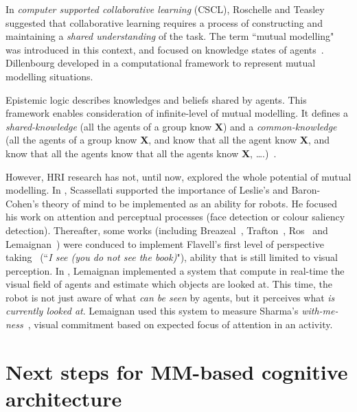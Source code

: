 \documentclass[conference]{IEEEtran}
\begin{document}
In \textit{computer supported collaborative learning} (CSCL), Roschelle and Teasley~\cite{roschelle1995construction} suggested that collaborative learning requires a process of constructing and maintaining a \textit{shared understanding} of the task. 
The term ``mutual modelling" was introduced in this context, and focused on knowledge states of agents~\cite{dillenbourg1999you}. Dillenbourg developed in \cite{sangin2007partner} a computational framework to represent mutual modelling situations.

Epistemic logic describes knowledges and beliefs shared by agents. This framework enables consideration of infinite-level of mutual modelling. It defines a \textit{shared-knowledge} (all the agents of a group know \textbf{X}) and a \textit{common-knowledge} (all the agents of a group know \textbf{X}, and know that all the agent know \textbf{X}, and know that all the agents know that all the agents know \textbf{X}, \dots.)~\cite{hendricks2008epistemic}. 

However, HRI research has not, until now, explored the whole potential of mutual modelling. In \cite{scassellati2002theory}, Scassellati supported the importance of Leslie's and Baron-Cohen's theory of mind to be implemented as an ability for robots. 
He focused his work on attention and perceptual processes (face detection or colour saliency detection). Thereafter, some works (including Breazeal~\cite{breazeal2006using}, Trafton~\cite{Trafton2005}, Ros~\cite{Ros2010} and Lemaignan~\cite{lemaignan2012thesis}) were conduced to implement Flavell's first level of perspective taking~\cite{flavell1977development} (``\textit{I see (you do not see the book)}"), ability that is still limited to visual perception. 
In \cite{lemaignan2016realtime}, Lemaignan implemented a system that compute in real-time the visual field of agents and estimate which objects are looked at. This time, the robot is not just aware of what \textit{can be seen} by agents, but it perceives what \textit{is currently looked at}. Lemaignan used this system to measure Sharma's \textit{with-me-ness}~\cite{sharma2014me}, visual commitment based on expected focus of attention in an activity. 

\section{Next steps for MM-based cognitive architecture}
\end{document}

